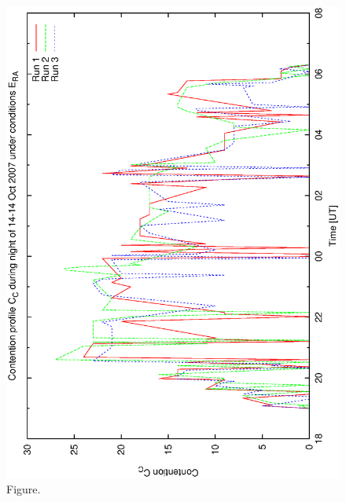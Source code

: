 \documentclass[12pt,a4paper]{article}
\begin{document}
\begin{figure}[htbp]
 \begin{center}
  \includegraphics[scale=1.0, angle=0]{figures/bsa_rnd1_cont.eps}
 \end{center}
  \caption[Figure.]
{Figure.}
\end{figure}
\clearpage
\end{document}
